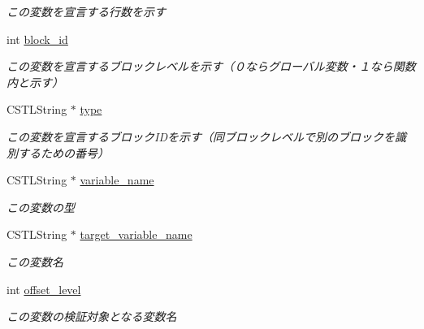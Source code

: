 \begin{DoxyCompactItemize}
\begin{DoxyCompactList}\small\item\em この変数を宣言する行数を示す \item\end{DoxyCompactList}\item 
\hypertarget{structvalidate__variable_a8f7988fadcaa504338c997c60b1b3674}{
int \hyperlink{structvalidate__variable_a8f7988fadcaa504338c997c60b1b3674}{block\_\-id}}
\label{structvalidate__variable_a8f7988fadcaa504338c997c60b1b3674}

\begin{DoxyCompactList}\small\item\em この変数を宣言するブロックレベルを示す（０ならグローバル変数・１なら関数内と示す） \item\end{DoxyCompactList}\item 
\hypertarget{structvalidate__variable_a25c2a484b27cf32f5be46d6fda3b8853}{
CSTLString $\ast$ \hyperlink{structvalidate__variable_a25c2a484b27cf32f5be46d6fda3b8853}{type}}
\label{structvalidate__variable_a25c2a484b27cf32f5be46d6fda3b8853}

\begin{DoxyCompactList}\small\item\em この変数を宣言するブロックIDを示す（同ブロックレベルで別のブロックを識別するための番号） \item\end{DoxyCompactList}\item 
\hypertarget{structvalidate__variable_a2be1b0e38218f7cc1b23644d1a6237ff}{
CSTLString $\ast$ \hyperlink{structvalidate__variable_a2be1b0e38218f7cc1b23644d1a6237ff}{variable\_\-name}}
\label{structvalidate__variable_a2be1b0e38218f7cc1b23644d1a6237ff}

\begin{DoxyCompactList}\small\item\em この変数の型 \item\end{DoxyCompactList}\item 
\hypertarget{structvalidate__variable_aa238dc06f28d558b5bb9ff8732539045}{
CSTLString $\ast$ \hyperlink{structvalidate__variable_aa238dc06f28d558b5bb9ff8732539045}{target\_\-variable\_\-name}}
\label{structvalidate__variable_aa238dc06f28d558b5bb9ff8732539045}

\begin{DoxyCompactList}\small\item\em この変数名 \item\end{DoxyCompactList}\item 
\hypertarget{structvalidate__variable_a17d23aaef8047824133aa011d7701810}{
int \hyperlink{structvalidate__variable_a17d23aaef8047824133aa011d7701810}{offset\_\-level}}
\label{structvalidate__variable_a17d23aaef8047824133aa011d7701810}

\begin{DoxyCompactList}\small\item\em この変数の検証対象となる変数名 \item\end{DoxyCompactList}\end{DoxyCompactItemize}


